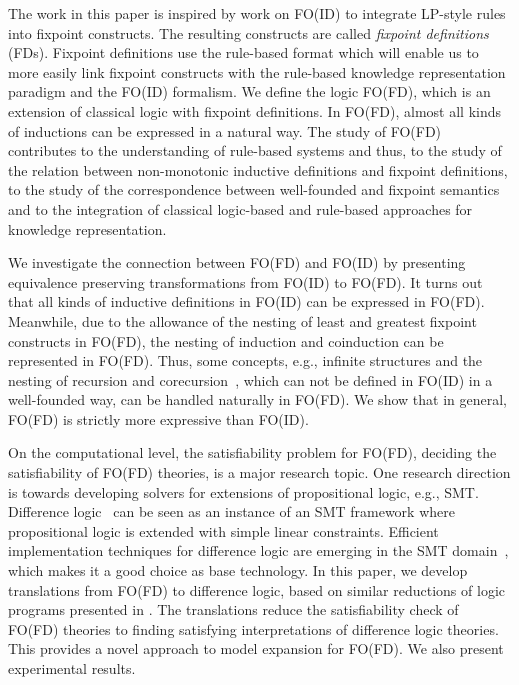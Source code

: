 \documentclass{tlp}
\begin{document}
The work in this paper is inspired by work on FO(ID) to integrate LP-style rules into fixpoint constructs. The resulting constructs are called {\em fixpoint definitions} (FDs). Fixpoint definitions use the rule-based format which will enable us to more easily link fixpoint constructs with the rule-based knowledge representation paradigm and the FO(ID) formalism. We define the logic FO(FD), which is an extension of classical logic with fixpoint definitions. In FO(FD), almost all kinds of inductions can be expressed in a natural way. The study of FO(FD) contributes to the understanding of rule-based systems and thus, to the study of the relation between non-monotonic inductive definitions and fixpoint definitions, to the study of the correspondence between well-founded and fixpoint semantics and to the integration of classical logic-based and rule-based approaches for knowledge representation.


We investigate the connection between FO(FD) and FO(ID) by presenting equivalence preserving transformations from FO(ID) to FO(FD). It turns out that all kinds of inductive definitions in FO(ID) can be expressed in FO(FD). Meanwhile, due to the allowance of the nesting of least and greatest fixpoint constructs in FO(FD), the nesting of induction and coinduction can be represented in FO(FD). Thus, some concepts, e.g., infinite structures and the nesting of recursion and corecursion~\cite{Barwise96}, which can not be defined in FO(ID) in a well-founded way, can be handled naturally in FO(FD). We show that in general, FO(FD) is strictly more expressive than FO(ID).

On the computational level, the satisfiability problem for FO(FD), deciding the satisfiability of FO(FD) theories, is a major research topic. One research direction is towards developing solvers for extensions of propositional logic, e.g., SMT. Difference logic~\cite{cav/NieuwenhuisO05} can be seen as an instance of an SMT framework where propositional logic is extended with simple linear constraints. Efficient implementation techniques for difference logic are emerging in the SMT domain~\cite{cav/NieuwenhuisO05,sat/cotton06}, which makes it a good choice as base technology. In this paper, we develop translations from FO(FD) to difference logic, based on similar reductions of logic programs presented in \cite{lpnmr/JanhunenNS09,amai/Niemela08}. The translations reduce the satisfiability check of FO(FD) theories to finding satisfying interpretations of difference logic theories. This provides a novel approach to model expansion for FO(FD). We also present experimental results.
\end{document}
